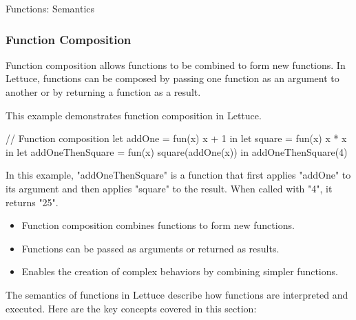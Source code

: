 \begin{notes}{Functions: Semantics}
\begin{highlight}
    \end{highlight}
    
    \subsubsection*{Function Composition}
    
    Function composition allows functions to be combined to form new functions. In Lettuce, functions can be composed by passing one function as an argument to another or by returning a function as a result.
    
    \begin{highlight}
    
        This example demonstrates function composition in Lettuce.
    
    \begin{code}[Lettuce]
    // Function composition
    let addOne = fun(x) { x + 1 } in
    let square = fun(x) { x * x } in
    let addOneThenSquare = fun(x) {
        square(addOne(x))
    } in
    addOneThenSquare(4)
    \end{code}
    
        In this example, "addOneThenSquare" is a function that first applies "addOne" to its argument and then applies "square" to the result. When called with "4", it returns "25".
    
        \begin{itemize}
            \item Function composition combines functions to form new functions.
            \item Functions can be passed as arguments or returned as results.
            \item Enables the creation of complex behaviors by combining simpler functions.
        \end{itemize}
    
    \end{highlight}
    
    \begin{highlight}
    
        The semantics of functions in Lettuce describe how functions are interpreted and executed. Here are the key concepts covered in this section:
    

\end{highlight}
\end{notes}
